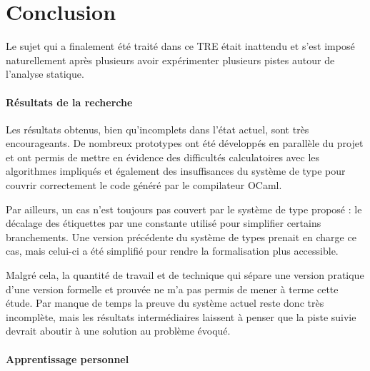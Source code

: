 \section{Conclusion}

Le sujet qui a finalement été traité dans ce TRE était inattendu et s'est
imposé naturellement après plusieurs avoir expérimenter plusieurs pistes autour
de l'analyse statique.

\paragraph{Résultats de la recherche}
Les résultats obtenus, bien qu'incomplets dans l'état actuel, sont très
encourageants. De nombreux prototypes ont été développés en parallèle du projet
et ont permis de mettre en évidence des difficultés calculatoires avec les
algorithmes impliqués et également des insuffisances du système de type pour
couvrir correctement le code généré par le compilateur OCaml.

Par ailleurs, un cas n'est toujours pas couvert par le système de type proposé :
le décalage des étiquettes par une constante utilisé pour simplifier certains
branchements.
Une version précédente du système de types prenait en charge ce
cas, mais celui-ci a été simplifié pour rendre la formalisation plus
accessible.

Malgré cela, la quantité de travail et de technique qui sépare une version
pratique d'une version formelle et prouvée ne m'a pas permis de mener à terme
cette étude.  Par manque de temps la preuve du système actuel reste donc très
incomplète, mais les résultats intermédiaires laissent à penser que la piste
suivie devrait aboutir à une solution au problème évoqué.

\paragraph{Apprentissage personnel}
